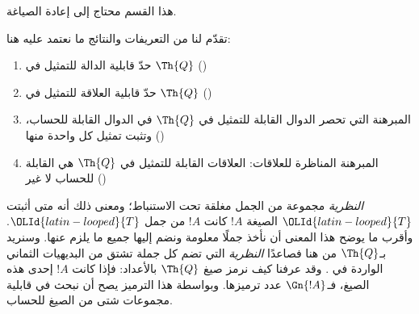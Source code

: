 \documentclass[../../../include/open-logic-section]{subfiles}
\begin{document}


\begin{editorial}
هذا القسم محتاج إلى إعادة الصياغة.
\end{editorial}

تقدّم لنا من التعريفات والنتائج ما نعتمد عليه هنا:
\begin{enumerate}
\item حدّ قابلية الدالة للتمثيل في $\Th{Q}$
  ()
\item حدّ قابلية العلاقة للتمثيل في $\Th{Q}$
  ()
\item المبرهنة التي تحصر الدوال القابلة للتمثيل في $\Th{Q}$ في الدوال
  القابلة للحساب، وتثبت تمثيل كل واحدة منها
  ()
\item المبرهنة المناظرة للعلاقات: العلاقات القابلة للتمثيل في $\Th{Q}$
  هي القابلة للحساب لا غير
  ()
\end{enumerate}

{ \em النظرية} مجموعة من الجمل مغلقة تحت الاستنباط؛ ومعنى ذلك أنه
متى أثبتت $\OLId{latin-looped}{T}$ الصيغة $!A$ كانت $!A$ من جمل $\OLId{latin-looped}{T}$. وأقرب ما يوضح هذا
المعنى أن نأخذ جملًا معلومة ونضم إليها جميع ما يلزم عنها. وسنريد
بـ$\Th{Q}$ من هنا فصاعدًا { \em النظرية} التي تضم كل جملة تشتق من
البديهيات الثماني الواردة في . وقد عرفنا كيف
نرمز صيغ $\Th{Q}$ بالأعداد: فإذا كانت $!A$ إحدى هذه الصيغ، فـ$\Gn{!A}$
عدد ترميزها. وبواسطة هذا الترميز يصح أن نبحث في قابلية مجموعات شتى
من الصيغ للحساب.
\end{document}
